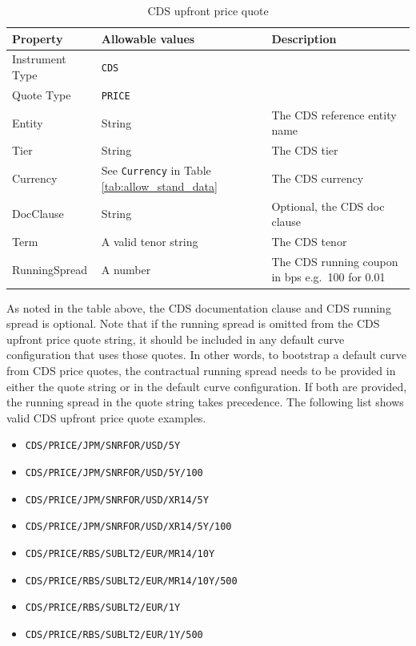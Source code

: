 \begin{table}[H]
\centering
  \begin{tabular}{|p{3cm}|p{3.5cm}|p{7cm}|}
    \hline
    {\bf Property} & {\bf Allowable values} & {\bf Description} \\ \hline
    Instrument Type & \lstinline!CDS! & \\ \hline
    Quote Type & \lstinline!PRICE! & \\ \hline
    Entity & String & The CDS reference entity name \\ \hline
    Tier & String & The CDS tier \\ \hline
    Currency & See \lstinline!Currency! in Table \ref{tab:allow_stand_data} & The CDS currency\\ \hline
    DocClause & String & Optional, the CDS doc clause \\ \hline
    Term & A valid tenor string & The CDS tenor\\ \hline
    RunningSpread & A number & The CDS running coupon in bps e.g.\ 100 for 0.01\\ \hline
  \end{tabular}
  \caption{CDS upfront price quote}
  \label{tab:cds_price_quote}
\end{table}

As noted in the table above, the CDS documentation clause and CDS running spread is optional. Note that if the running spread is omitted from the CDS upfront price quote string, it should be included in any default curve configuration that uses those quotes. In other words, to bootstrap a default curve from CDS price quotes, the contractual running spread needs to be provided in either the quote string or in the default curve configuration. If both are provided, the running spread in the quote string takes precedence. The following list shows valid CDS upfront price quote examples.
\begin{itemize}
\item \lstinline!CDS/PRICE/JPM/SNRFOR/USD/5Y!
\item \lstinline!CDS/PRICE/JPM/SNRFOR/USD/5Y/100!
\item \lstinline!CDS/PRICE/JPM/SNRFOR/USD/XR14/5Y!
\item \lstinline!CDS/PRICE/JPM/SNRFOR/USD/XR14/5Y/100!
\item \lstinline!CDS/PRICE/RBS/SUBLT2/EUR/MR14/10Y!
\item \lstinline!CDS/PRICE/RBS/SUBLT2/EUR/MR14/10Y/500!
\item \lstinline!CDS/PRICE/RBS/SUBLT2/EUR/1Y!
\item \lstinline!CDS/PRICE/RBS/SUBLT2/EUR/1Y/500!
\end{itemize}

